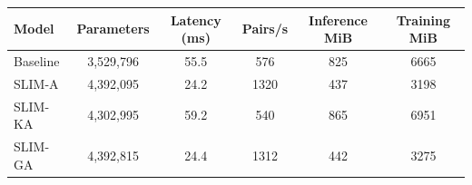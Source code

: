 \begin{tabular}{lccccc}
\toprule
Model & Parameters & Latency (ms) & Pairs/s & Inference MiB & Training MiB \\
\midrule
Baseline & 3,529,796 & 55.5 & 576 & 825 & 6665 \\
SLIM-A & 4,392,095 & 24.2 & 1320 & 437 & 3198 \\
SLIM-KA & 4,302,995 & 59.2 & 540 & 865 & 6951 \\
SLIM-GA & 4,392,815 & 24.4 & 1312 & 442 & 3275 \\
\bottomrule
\end{tabular}
